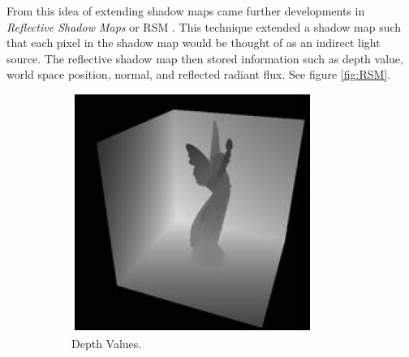 From this idea of extending shadow maps came further developments in \textit{Reflective Shadow Maps} or RSM \cite{Dachsbacher2005}.  This technique extended a shadow map such that each pixel in the shadow map would be thought of as an indirect light source.  The reflective shadow map then stored information such as depth value, world space position, normal, and reflected radiant flux.  See figure \ref{fig:RSM}.

\begin{figure}
		\centering
        \begin{subfigure}[b]{0.4\textwidth}
                \centering
                \includegraphics[width=\textwidth]{shadowMap1.jpg}
                \caption{Depth Values.}
                \label{fig:RSM0}
        \end{subfigure}
        \begin{subfigure}[b]{0.4\textwidth}
				\centering

\end{subfigure}
\end{figure}
